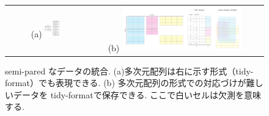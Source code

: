 \documentclass[a4paper,12ptc]{jsarticle} %
\begin{document}
\begin{figure}
    \centering
    \begin{tabular}{c|c}
    \footnotesize (a)
    \includegraphics[width=0.2\textwidth]{img/threeway.pdf} &
    \footnotesize (b)
    \includegraphics[width=0.7\textwidth]{img/mosaic.pdf} 
    \end{tabular}
    \caption{semi-pared なデータの統合. (a)多次元配列は右に示す形式（tidy-format）でも表現できる.  (b) 多次元配列の形式での対応づけが難しいデータを tidy-formatで保存できる. ここで白いセルは欠測を意味する.}
    \label{fig_mosaic}
\end{figure}
\end{document}
